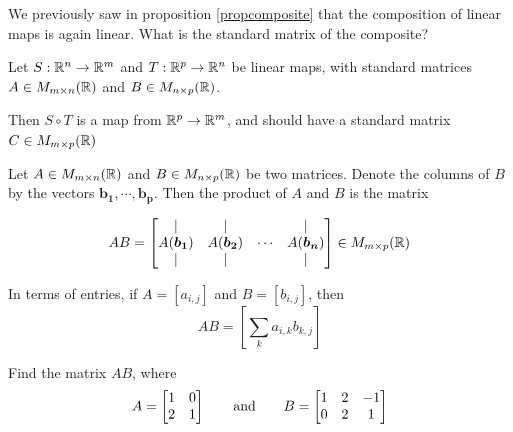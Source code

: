 \begin{motivating}
We previously saw in proposition \ref{propcomposite} that the composition of linear maps is again linear.  What is the standard matrix of the composite?
\end{motivating}

Let $S: \mathbb{R}^n \to \mathbb{R}^m$ and $T : \mathbb{R}^p \to \mathbb{R}^n$ be linear maps, with standard matrices $A \in M_{m \times n}(\mathbb{R})$ and $B \in M_{n \times p}(\mathbb{R})$.

Then $S \circ T$ is a map from $\mathbb{R}^p \to \mathbb{R}^m$, and should have a standard matrix $C \in M_{m \times p}(\mathbb{R})$

\begin{definition}
    
    Let $A \in M_{m \times n}(\mathbb{R})$ and $B \in M_{n \times p}(\mathbb{R})$ be two matrices.  Denote the columns of $B$ by the vectors $\bm{b_1}, \cdots, \bm{b_p}$.  Then the product of $A$ and $B$ is the matrix
    
    \begin{equation*}
AB = 
\begin{bmatrix}
\vert & \vert & & \vert \\
    A(\bm{b_1})   & A(\bm{b_2}) & \cdots & A(\bm{b_n})  \\
    \vert & \vert & & \vert
\end{bmatrix} \in M_{m \times p}(\mathbb{R})
\end{equation*}
    
    
    In terms of entries, if $A = [a_{i,j}]$ and $B = [b_{i,j}]$, then $$AB = \left[\sum_k a_{i,k}b_{k,j}\right]$$
    

    
\end{definition}


\begin{example}
    Find the matrix $AB$, where \begin{equation*}
A = 
\begin{bmatrix}
1 & 0 \\
2 & 1
\end{bmatrix} \qquad \textnormal{and} \qquad B = 
\begin{bmatrix}
1 & 2 & -1 \\
0 & 2 & 1
\end{bmatrix}
\end{equation*}
\end{example}


